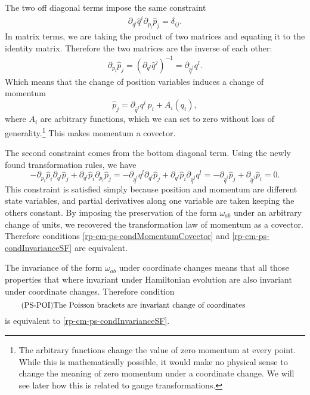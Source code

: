 The two off diagonal terms impose the same constraint
\begin{equation}
	\begin{aligned}
		\partial_{q^l} \hat{q}^i \partial_{p_l} \hat{p}_j = \delta_{ij}.
	\end{aligned}
\end{equation}
In matrix terms, we are taking the product of two matrices and equating it to the identity matrix. Therefore the two matrices are the inverse of each other:
\begin{equation}
	\begin{aligned}
		\partial_{p_l} \hat{p}_j = (\partial_{q^l} \hat{q}^j)^{-1} = \partial_{\hat{q}^j} q^l.
	\end{aligned}
\end{equation}
Which means that the change of position variables induces a change of momentum
\begin{equation}\label{rp-cm-momentumUnderUnitChange}
	\hat{p}_j = \partial_{\hat{q}^j} q^i \, p_i + A_i(q_i),
\end{equation}
where $A_i$ are arbitrary functions, which we can set to zero without loss of generality.\footnote{The arbitrary functions change the value of zero momentum at every point. While this is mathematically possible, it would make no physical sense to change the meaning of zero momentum under a coordinate change. We will see later how this is related to gauge transformations.} This makes momentum a covector.

The second constraint comes from the bottom diagonal term. Using the newly found transformation rules, we have
\begin{equation}
	- \partial_{p_l} \hat{p}_i \partial_{q^l} \hat{p}_j +  \partial_{q^l} \hat{p}_i \partial_{p_l} \hat{p}_j = - \partial_{\hat{q}^i} q^l \partial_{q^l} \hat{p}_j +  \partial_{q^l} \hat{p}_i \partial_{\hat{q}^j} q^l = - \partial_{\hat{q}^i} \hat{p}_j + \partial_{\hat{q}^j} \hat{p}_i = 0.
\end{equation}
This constraint is satisfied simply because position and momentum are different state variables, and partial derivatives along one variable are taken keeping the others constant. By imposing the preservation of the form $\omega_{ab}$ under an arbitrary change of units, we recovered the transformation law of momentum as a covector. Therefore conditions \ref{rp-cm-ps-condMomentumCovector} and \ref{rp-cm-ps-condInvarianceSF} are equivalent.

The invariance of the form $\omega_{ab}$ under coordinate changes means that all those properties that where invariant under Hamiltonian evolution are also invariant under coordinate changes. Therefore condition
\begin{equation}
	\tag{PS-POI}\label{rp-cm-ps-condInvariancePoisson}
	\eqtext{The Poisson brackets are invariant change of coordinates} \\
\end{equation}
is equivalent to \ref{rp-cm-ps-condInvarianceSF}.

